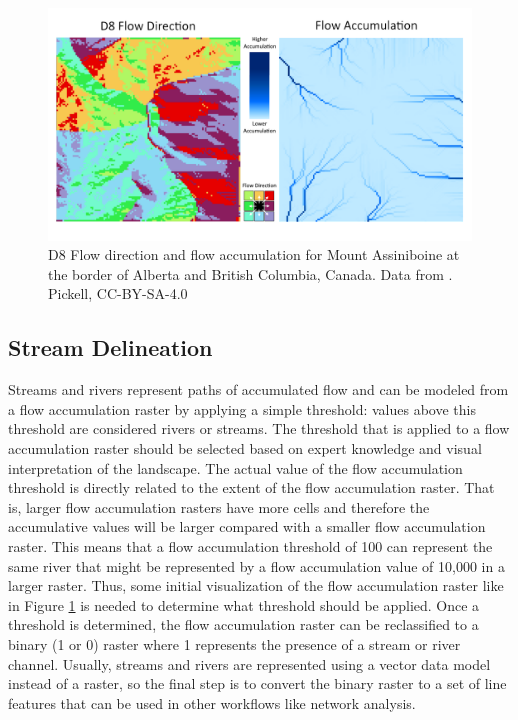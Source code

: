 \documentclass[
]{book}
\begin{document}
\begin{figure}
\includegraphics[width=0.75\linewidth]{images/09-mount-assiniboine-flow-dir-acc} \caption{D8 Flow direction and flow accumulation for Mount Assiniboine at the border of Alberta and British Columbia, Canada. Data from \citep{natural_resources_canada_canadian_2015}. Pickell, CC-BY-SA-4.0}\label{fig:9-mount-assiniboine-flow-dir-acc}
\end{figure}

\subsection{Stream Delineation}\label{stream-delineation}

Streams and rivers represent paths of accumulated flow and can be modeled from a flow accumulation raster by applying a simple threshold: values above this threshold are considered rivers or streams. The threshold that is applied to a flow accumulation raster should be selected based on expert knowledge and visual interpretation of the landscape. The actual value of the flow accumulation threshold is directly related to the extent of the flow accumulation raster. That is, larger flow accumulation rasters have more cells and therefore the accumulative values will be larger compared with a smaller flow accumulation raster. This means that a flow accumulation threshold of 100 can represent the same river that might be represented by a flow accumulation value of 10,000 in a larger raster. Thus, some initial visualization of the flow accumulation raster like in Figure \ref{fig:9-mount-assiniboine-flow-dir-acc} is needed to determine what threshold should be applied. Once a threshold is determined, the flow accumulation raster can be reclassified to a binary (1 or 0) raster where 1 represents the presence of a stream or river channel. Usually, streams and rivers are represented using a vector data model instead of a raster, so the final step is to convert the binary raster to a set of line features that can be used in other workflows like network analysis.
\end{document}
